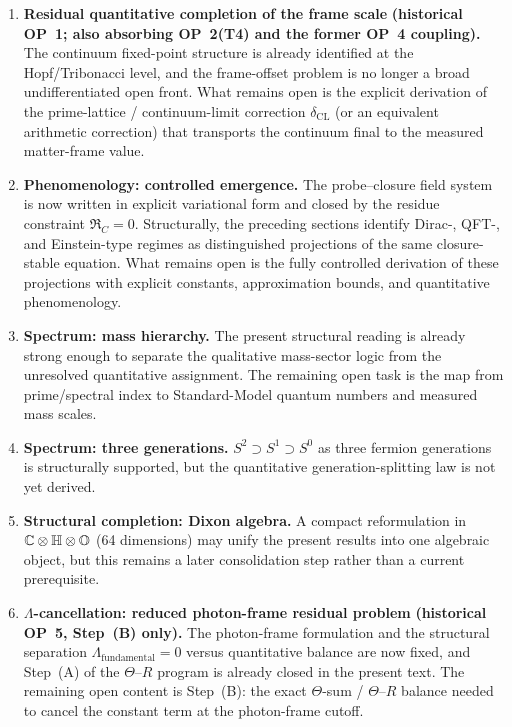 \begin{enumerate}
 \item \textbf{Residual quantitative completion of the frame scale}
 \textbf{(historical OP~1; also absorbing OP~2(T4) and the former OP~4 coupling).}
 The continuum fixed-point structure is already identified at the
 Hopf/Tribonacci level, and the frame-offset problem is no longer a
 broad undifferentiated open front. What remains open is the explicit
 derivation of the prime-lattice / continuum-limit correction
 $\delta_{\mathrm{CL}}$ (or an equivalent arithmetic correction)
 that transports the continuum final to the measured matter-frame
 value.

 \item \textbf{Phenomenology: controlled emergence.}
 The probe--closure field system is now written in explicit
 variational form and closed by the residue constraint
 $\mathfrak R_C=0$.
 Structurally, the preceding sections identify Dirac-, QFT-, and
 Einstein-type regimes as distinguished projections of the same
 closure-stable equation. What remains open is the fully controlled
 derivation of these projections with explicit constants,
 approximation bounds, and quantitative phenomenology.

 \item \textbf{Spectrum: mass hierarchy.}
 The present structural reading is already strong enough to separate the
 qualitative mass-sector logic from the unresolved quantitative
 assignment. The remaining open task is the map from prime/spectral
 index to Standard-Model quantum numbers and measured mass scales.

 \item \textbf{Spectrum: three generations.}
 $S^2\supset S^1\supset S^0$ as three fermion generations is
 structurally supported, but the quantitative generation-splitting law
 is not yet derived.

 \item \textbf{Structural completion: Dixon algebra.}
 A compact reformulation in
 $\mathbb{C}\otimes\mathbb{H}\otimes\mathbb{O}$ (64 dimensions) may unify
 the present results into one algebraic object, but this remains a
 later consolidation step rather than a current prerequisite.

 \item \textbf{$\Lambda$-cancellation: reduced photon-frame residual problem}
 \textbf{(historical OP~5, Step~(B) only).}
 The photon-frame formulation and the structural separation
 $\Lambda_{\mathrm{fundamental}}=0$ versus quantitative balance are now
 fixed, and Step~(A) of the $\Theta$--$R$ program is already closed in
 the present text. The remaining open content is Step~(B): the exact
 $\Theta$-sum / $\Theta$--$R$ balance needed to cancel the constant term
 at the photon-frame cutoff.
\end{enumerate}

